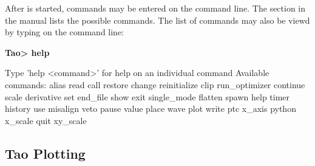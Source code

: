 \documentclass{report}
\begin{document}
After  is started, commands may be entered on the command line. The section
 in the  manual lists the possible commands. The list
of commands may also be viewd by typing  on the command line:
\begin{example}
  {\normalfont\textbf{Tao> help}}

  Type 'help <command>' for help on an individual command
  Available commands:
    alias                             read
    call                              restore
    change                            reinitialize
    clip                              run_optimizer
    continue                          scale
    derivative                        set
    end_file                          show
    exit                              single_mode
    flatten                           spawn
    help                              timer
    history                           use
    misalign                          veto
    pause                             value
    place                             wave
    plot                              write
    ptc                               x_axis
    python                            x_scale
    quit                              xy_scale
\end{example}

\subsection{Tao Plotting}
\end{document}
